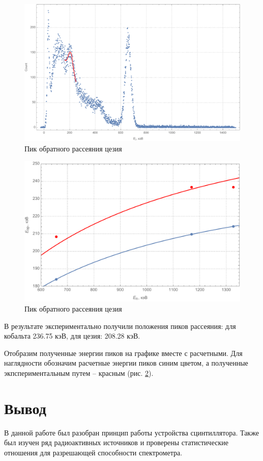 \documentclass[a4paper, 12pt]{article}
\begin{document}
\begin{figure}[!htb]
\centering
\includegraphics[scale=0.46]{cs137Reverse.pdf}
\caption{Пик обратного рассеяния цезия}
\label{fig:ce137Re}
\end{figure}
\begin{figure}[!htb]
\centering
\includegraphics[scale=0.6]{gotPeaks.pdf}
\caption{Пик обратного рассеяния цезия}
\label{fig:gotPeaks}
\end{figure}
\par
В результате экспериментально получили положения пиков рассеяния: для кобальта 236.75 кэВ, для цезия: 208.28 кэВ.\par
Отобразим полученные энергии пиков на графике вместе с расчетными. Для наглядности обозначим расчетные энергии пиков синим цветом, а полученные экпспериментальным путем -- красным (рис. \ref{fig:gotPeaks}).
\section{Вывод}
В данной работе был разобран принцип работы устройства сцинтиллятора. Также был изучен ряд радиоактивных источников и проверены статистические отношения для разрешающей способности спектрометра.
\end{document}
